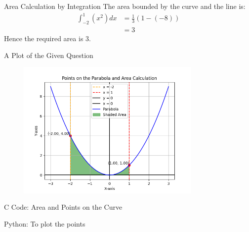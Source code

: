 \documentclass{beamer}
\providecommand{\brak}[1]{\ensuremath{\left(#1\right)}}
\theoremstyle{remark}
\numberwithin{equation}{section}
\begin{document}
\begin{frame}{Area Calculation by Integration}
The area bounded by the curve and the line is:
\begin{align}
  \int_{-2}^{1} \brak{x^2} dx &= \frac{1}{3} \left( 1 - (-8) \right) \\
  &= 3
\end{align}
Hence the required area is \(3\).
\end{frame}

\begin{frame}{A Plot of the Given Question}
\begin{figure}[ht]
  \centering
  \includegraphics[width=0.8\textwidth]{figs/fig.png} %
\end{figure}
\end{frame}

\begin{frame}{C Code: Area and Points on the Curve}
    
\end{frame}

\begin{frame}{Python: To plot the points}
    
\end{frame}
\end{document}
